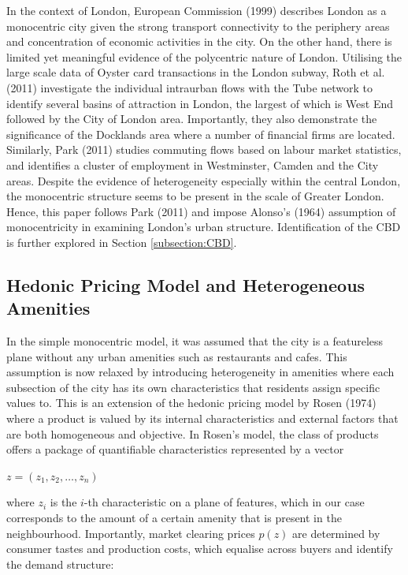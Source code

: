 \documentclass{article}
\begin{document}
In the context of London, European Commission (1999) describes London as a monocentric city given the strong transport connectivity to the periphery areas and concentration of economic activities in the city. On the other hand, there is limited yet meaningful evidence of the polycentric nature of London. Utilising the large scale data of Oyster card transactions in the London subway, Roth et al. (2011) investigate the individual intraurban flows with the Tube network to identify several basins of attraction in London, the largest of which is West End followed by the City of London area. Importantly, they also demonstrate the significance of the Docklands area where a number of financial firms are located. Similarly, Park (2011) studies commuting flows based on labour market statistics, and identifies a cluster of employment in Westminster, Camden and the City areas. Despite the evidence of heterogeneity especially within the central London, the monocentric structure seems to be present in the scale of Greater London. Hence, this paper follows Park (2011) and impose Alonso's (1964) assumption of monocentricity in examining London's urban structure. Identification of the CBD is further explored in Section \ref{subsection:CBD}.

\subsection{Hedonic Pricing Model and Heterogeneous Amenities} \label{subsection:hedonic} 
In the simple monocentric model, it was assumed that the city is a featureless plane without any urban amenities such as restaurants and cafes. This assumption is now relaxed by introducing heterogeneity in amenities where each subsection of the city has its own characteristics that residents assign specific values to. This is an extension of the hedonic pricing model by Rosen (1974) where a product is valued by its internal characteristics and external factors that are both homogeneous and objective. In Rosen's model, the class of products offers a package of quantifiable characteristics represented by a vector 

\begin{center}
    $z = \left( z _ { 1 } , z _ { 2 } , \dots , z _ { n } \right)$
\end{center}

where $z_i$ is the $i$-th characteristic on a plane of features, which in our case corresponds to the amount of a certain amenity that is present in the neighbourhood. Importantly, market clearing prices $p(z)$ are determined by consumer tastes and production costs, which equalise across buyers and identify the demand structure:
\end{document}
